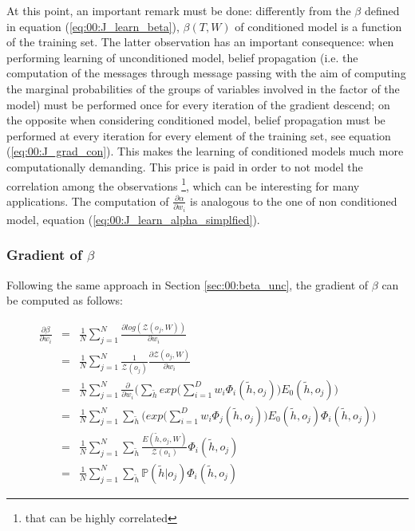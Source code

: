 At this point, an important remark must be done: differently from the $\beta$ defined in equation (\ref{eq:00:J_learn_beta}),  $\beta(T, W)$ of conditioned model is a function of the training set. The latter observation has an important consequence: when performing learning of unconditioned model, belief propagation (i.e. the computation of the messages through message passing with the aim of computing the marginal probabilities of the groups of variables involved in the factor of the model) must be performed once for every iteration of the gradient descend; on the opposite when considering conditioned model, belief propagation must be performed at every iteration for every element of the training set, see equation (\ref{eq:00:J_grad_con}). This makes the learning of conditioned models much more computationally demanding. This price is paid in order to not model the correlation among the observations \footnote{that can be highly correlated}, which can be interesting for many applications.
The computation of $\frac{\partial \alpha}{\partial w_i}$ is analogous to the one of non conditioned model, equation (\ref{eq:00:J_learn_alpha_simplfied}).

\subsubsection{Gradient of $\beta$}

Following the same approach in Section \ref{sec:00:beta_unc}, the gradient of $\beta$ can be computed as follows:

\begin{eqnarray}
\frac{\partial \beta}{\partial w_i} &=& \frac{1}{N} \sum_{j=1}^{N} \frac{\partial log(\mathcal{Z}(o_j, W))}{\partial w_i} \nonumber\\
&=& \frac{1}{N} \sum_{j=1}^{N} \frac{1}{\mathcal{Z}(o_j)} \frac{\partial \mathcal{Z}(o_j, W)}{\partial w_i} \nonumber\\
&=& \frac{1}{N} \sum_{j=1}^{N} \frac{\partial}{\partial w_i} \bigg( 
\sum_{\tilde{h}} exp \big(\sum_{i=1}^D w_i \Phi_i(\tilde{h}, o_j) \big)E_0(\tilde{h}, o_j)
\bigg) \nonumber\\
&=& \frac{1}{N} \sum_{j=1}^{N}  
\sum_{\tilde{h}} \bigg(  exp \big(\sum_{i=1}^D w_i \Phi_j(\tilde{h}, o_j) \big)E_0(\tilde{h}, o_j)\Phi_i(\tilde{h}, o_j) \bigg)  \nonumber\\
&=& \frac{1}{N} \sum_{j=1}^{N}  \sum_{\tilde{h}} \frac{E(\tilde{h}, o_j, W)}{\mathcal{Z}(o_1)}\Phi_i(\tilde{h}, o_j)   \nonumber\\
&=& \frac{1}{N} \sum_{j=1}^{N}  \sum_{\tilde{h}} \mathbb{P}(\tilde{h}| o_j) \Phi_i(\tilde{h}, o_j)
\end{eqnarray}

